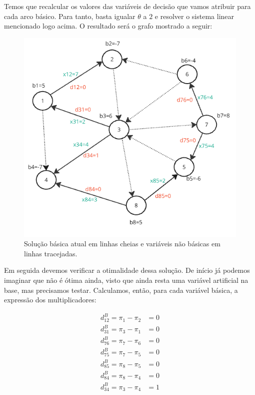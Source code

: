 \documentclass{article}
\begin{document}
Temos que recalcular os valores das variáveis de decisão que vamos atribuir para cada arco básico.
Para tanto, basta igualar $\theta$ a $2$ e resolver o sistema linear mencionado logo acima.
O resultado será o grafo mostrado a seguir:

\begin{figure}[H]
    \centering
    \includegraphics[scale=0.7]{images/grafo-res-2.png}
    \caption{Solução básica atual em linhas cheias e variáveis não básicas em linhas tracejadas.}
\end{figure}


Em seguida devemos verificar a otimalidade dessa solução.
De início já podemos imaginar que não é ótima ainda, visto que ainda resta uma variável artificial na base, mas precisamos testar.
Calculamos, então, para cada variável básica, a expressão dos multiplicadores:

\begin{align*}
    d_{12}^{B} = \pi_{1} - \pi_{2} &= 0 \\
    d_{31}^{B} = \pi_{3} - \pi_{1} &= 0 \\
    d_{76}^{B} = \pi_{7} - \pi_{6} &= 0 \\
    d_{75}^{B} = \pi_{7} - \pi_{5} &= 0 \\
    d_{85}^{B} = \pi_{8} - \pi_{5} &= 0 \\
    d_{84}^{B} = \pi_{8} - \pi_{4} &= 0 \\
    d_{34}^{B} = \pi_{3} - \pi_{4} &= 1 \\
\end{align*}
\end{document}
